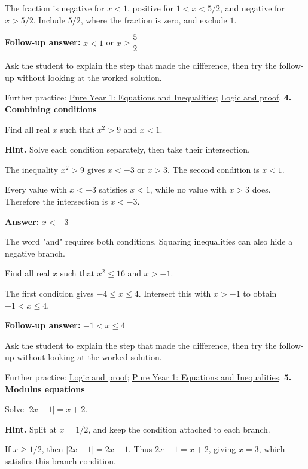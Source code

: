 \documentclass[11pt,a4paper]{article}
\newcommand{\smallheading}[1]{\par\vspace{9pt}{\large\bfseries #1}\par\vspace{1pt}}
\begin{document}
The fraction is negative for \(x<1\), positive for \(1<x<5/2\), and negative for \(x>5/2\). Include \(5/2\), where the fraction is zero, and exclude \(1\).

\textbf{Follow-up answer:} \(x<1\) or \(x\geq\dfrac52\)\par
\vfill\smallheading{Teaching note}
Ask the student to explain the step that made the difference, then try the follow-up without looking at the worked solution.\par
{\small Further practice: \href{https://maths.arijasad.com/edexcel-pure-year-1.html#chapter-3}{Pure Year 1: Equations and Inequalities}; \href{https://maths.arijasad.com/tmua-logic-proof.html}{Logic and proof}.}
\newpage
{\LARGE\bfseries 4. Combining conditions}\par
\smallheading{Diagnostic question}
Find all real \(x\) such that \(x^2>9\) and \(x<1\).\par
\textbf{Hint.} Solve each condition separately, then take their intersection.\par
\smallheading{Worked solution}
The inequality \(x^2>9\) gives \(x<-3\) or \(x>3\). The second condition is \(x<1\).

Every value with \(x<-3\) satisfies \(x<1\), while no value with \(x>3\) does. Therefore the intersection is \(x<-3\).

\textbf{Answer:} \(x<-3\)\par
\smallheading{What to notice}
The word "and" requires both conditions. Squaring inequalities can also hide a negative branch.\par
\smallheading{Matched follow-up}
Find all real \(x\) such that \(x^2\leq16\) and \(x>-1\).\par
The first condition gives \(-4\leq x\leq4\). Intersect this with \(x>-1\) to obtain \(-1<x\leq4\).

\textbf{Follow-up answer:} \(-1<x\leq4\)\par
\vfill\smallheading{Teaching note}
Ask the student to explain the step that made the difference, then try the follow-up without looking at the worked solution.\par
{\small Further practice: \href{https://maths.arijasad.com/tmua-logic-proof.html}{Logic and proof}; \href{https://maths.arijasad.com/edexcel-pure-year-1.html#chapter-3}{Pure Year 1: Equations and Inequalities}.}
\newpage
{\LARGE\bfseries 5. Modulus equations}\par
\smallheading{Diagnostic question}
Solve \(|2x-1|=x+2\).\par
\textbf{Hint.} Split at \(x=1/2\), and keep the condition attached to each branch.\par
\smallheading{Worked solution}
If \(x\geq1/2\), then \(|2x-1|=2x-1\). Thus \(2x-1=x+2\), giving \(x=3\), which satisfies this branch condition.
\end{document}
